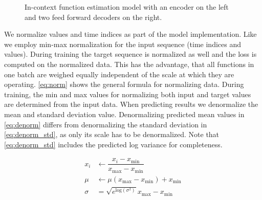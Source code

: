 \begin{figure}
		\centering
	\caption{In-context function estimation model with an encoder on the left and two feed forward decoders on the right.}
	\label{fig:model}
\end{figure}

We normalize values and time indices as part of the model implementation. Like \citet{seifner2025zeroshotimputationfoundationinference} we employ min-max normalization for the input sequence (time indices and values). During training the target sequence is normalized as well and the loss is computed on the normalized data. This has the advantage, that all functions in one batch are weighed equally independent of the scale at which they are operating. \autoref{eq:norm} shows the general formula for normalizing data. During training, the min and max values for normalizing both input and target values are determined from the input data. When predicting results we denormalize the mean and standard deviation value. Denormalizing predicted mean values in \autoref{eq:denorm} differs from denormalizing the standard deviation in \autoref{eq:denorm_std}, as only its scale has to be denormalized. Note that \autoref{eq:denorm_std} includes the predicted log variance for completeness.

\begin{align}
x_i &\leftarrow \dfrac{x_i-x_{\text{min}}}{x_{\text{max}}-x_{\text{min}}} \label{eq:norm} \\
\mu &\leftarrow \mu (x_{\text{max}}-x_{\text{min}}) + x_{\text{min}} \label{eq:denorm} \\
\sigma &= \sqrt{e^{\text{log}(\sigma^2)}} x_{\text{max}}-x_{\text{min}} \label{eq:denorm_std} 
\end{align}



